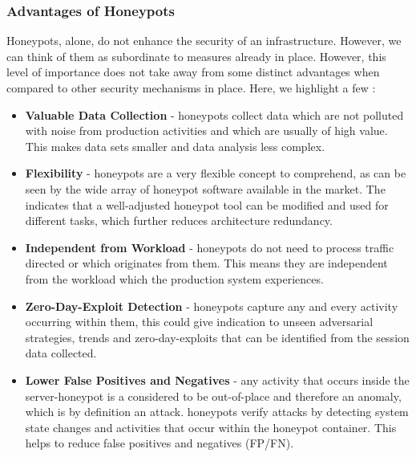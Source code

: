 \documentclass[grad,lot,lof,11pt,oneside,onehalfspace]{RUthesis}
\begin{document}
\subsubsection{Advantages of Honeypots}
Honeypots, alone, do not enhance the security of an infrastructure. However, we can think of them as subordinate to measures already in place. However, this level of importance does not take away from some distinct advantages when compared to other security mechanisms in place. Here, we highlight a few \cite{nawrocki_survey_2016}:
\begin{itemize}
\item{\textbf{Valuable Data Collection} -}
honeypots collect data which are not polluted  with noise  from production activities and which are usually of high value. This makes data sets smaller and data analysis less complex.
\item{\textbf{Flexibility} -}
honeypots are a very flexible concept to comprehend, as can be seen by the wide array of honeypot software available in the market. The indicates that a well-adjusted honeypot tool can be modified and used for different tasks, which further reduces architecture redundancy. 
\item{\textbf{Independent from Workload} -}
honeypots do not need to process traffic directed or which originates from them. This means they are independent from the workload which the production system experiences. 
\item{\textbf{Zero-Day-Exploit Detection} -}
honeypots capture any and every activity occurring within them, this could give indication to unseen adversarial strategies, trends and zero-day-exploits that can be identified from the session data collected.
\item{\textbf{Lower False Positives and Negatives} -}
any activity that occurs inside the server-honeypot is a considered to be out-of-place and therefore an anomaly, which is by definition an attack. honeypots verify attacks by detecting system state changes and activities that occur within the honeypot container. This helps to reduce false positives and negatives (FP/FN).  
\end{itemize}
\end{document}
